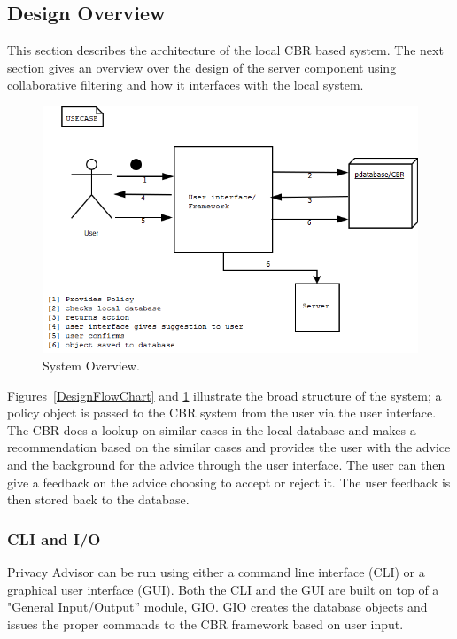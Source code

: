 \subsection{Design Overview}
This section describes the architecture of the local CBR based system. The next section gives an overview over the design of the server component using collaborative filtering and how it interfaces with the local system.  

\begin{figure}[htbp]
\begin{center}
\includegraphics[width = \textwidth]{DesignReport/uml/Case.png}
\caption{System Overview.}
\label{SystemOverview}
\end{center}
\end{figure}

Figures~\ref{DesignFlowChart} and \ref{SystemOverview} illustrate the broad structure of the system; a policy object is passed to the CBR system from the user via the user interface. The CBR does a lookup on similar cases in the local database and makes a recommendation based on the similar cases and provides the user with the advice and the background for the advice through the user interface. The user can then give a feedback on the advice choosing to accept or reject it. The user feedback is then stored back to the database.

\subsubsection{CLI and I/O}
Privacy Advisor can be run using either a command line interface (CLI) or a graphical user interface (GUI). Both the CLI and the GUI are built on top of a "General Input/Output'' module, GIO. GIO creates the database objects and issues the proper commands to the CBR framework based on user input.

